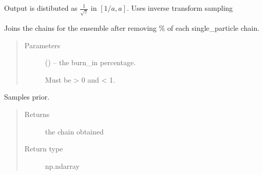 \documentclass[letterpaper,10pt,english,openany,oneside]{sphinxmanual}
\begin{document}
\begin{fulllineitems}
\begin{fulllineitems}
Output is distibuted as \(\frac{1}{\sqrt{z}}\)  in \([1/a,a]\).
Uses inverse transform sampling

\end{fulllineitems}


\begin{fulllineitems}
\label{\detokenize{autogen:samplers.AIESampler.join_chains}}
Joins the chains for the ensemble after removing   \% of each single\_particle chain.
\begin{quote}\begin{description}
\item[{Parameters}] \leavevmode
{} (\sphinxstyleliteralemphasis{\sphinxupquote{, }}) – 
the burn\_in percentage.

Must be  > 0 and  < 1.


\end{description}\end{quote}

\end{fulllineitems}


\begin{fulllineitems}
\label{\detokenize{autogen:samplers.AIESampler.sample_prior}}
Samples prior.
\begin{quote}\begin{description}
\item[{Returns}] \leavevmode
the chain obtained

\item[{Return type}] \leavevmode
np.ndarray

\end{description}\end{quote}

\end{fulllineitems}


\end{fulllineitems}
\end{document}
